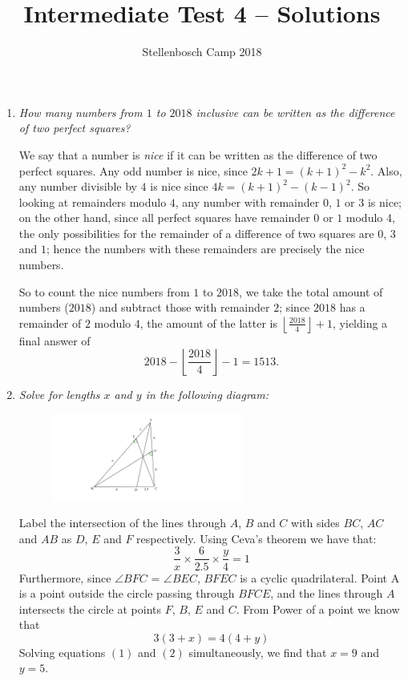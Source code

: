 \documentclass{article}
\title{Intermediate Test 4 -- Solutions}
\author{Stellenbosch Camp 2018}
\date{\vspace{-12pt}}
\newcommand{\floor}[1]{\ensuremath{\left\lfloor#1\right\rfloor}}
\begin{document}
\maketitle

\begin{enumerate}[1.]

\item %
\textit{How many numbers from $1$ to $2018$ inclusive can be written as the difference of two perfect squares?}

We say that a number is \emph{nice} if it can be written as the difference of two perfect squares. Any odd number is nice, since $2k+1 = (k+1)^2 -k^2$. Also, any number divisible by $4$ is nice since $4k = (k+1)^2 -(k-1)^2$. So looking at remainders modulo $4$, any number with remainder $0$, $1$ or $3$ is nice; on the other hand, since all perfect squares have remainder $0$ or $1$ modulo 4, the only possibilities for the remainder of a difference of two squares are $0$, $3$ and $1$; hence the numbers with these remainders are precisely the nice numbers.

So to count the nice numbers from $1$ to $2018$, we take the total amount of numbers ($2018$) and subtract those with remainder $2$; since $2018$ has a remainder of $2$ modulo $4$, the amount of the latter is $\floor{\frac{2018}{4}} +1$, yielding a final answer of \[ 2018 - \floor{\frac{2018}{4}} -1 = 1513. \]


\vspace{12pt}
\item %
\textit{Solve for lengths $x$ and $y$ in the following diagram:}

\begin{figure}[h]
\centering
\includegraphics[width=0.6\textwidth]{GeogebraTest4sol.png}
\end{figure}

Label the intersection of the lines through $A$, $B$ and $C$ with sides $BC$, $AC$ and $AB$ as $D$, $E$ and $F$ respectively.
Using Ceva's theorem we have that: 
\begin{equation}
\frac{3}{x} \times \frac{6}{2.5} \times \frac{y}{4} = 1
\end{equation}
Furthermore, since $\angle BFC$ = $\angle BEC$, $BFEC$ is a cyclic quadrilateral. Point A is a point outside the circle passing through $BFCE$, and the lines through $A$ intersects the circle at points $F$, $B$, $E$ and $C$. From Power of a point we know that
\begin{equation}
3(3+x) = 4(4+y)
\end{equation}
Solving equations $(1)$ and $(2)$ simultaneously, we find that $x = 9$ and $y = 5$.



\end{enumerate}
\end{document}
